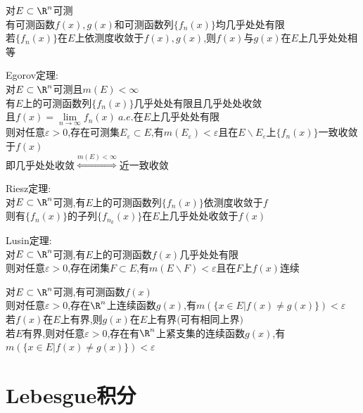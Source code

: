 \begin{dingli}
对$E\subset\R^n$可测\\
有可测函数$f(x),g(x)$和可测函数列$\{f_n(x)\}$均几乎处处有限\\
若$\{f_n(x)\}$在$E$上依测度收敛于$f(x),g(x)$,则$f(x)$与$g(x)$在$E$上几乎处处相等
\end{dingli}

\begin{dingli}
Egorov定理:\\
对$E\subset\R^n$可测且$m(E)<\infty$\\
有$E$上的可测函数列$\{f_n(x)\}$几乎处处有限且几乎处处收敛\\
且$f(x)=\lim\limits_{n\to\infty}f_n(x)\ a.e.$在$E$上几乎处处有限\\
则对任意$\varepsilon>0$,存在可测集$E_{\varepsilon}\subset E$,有$m(E_{\varepsilon})<\varepsilon$且在$E\backslash E_{\varepsilon}$上$\{f_n(x)\}$一致收敛于$f(x)$\\
即几乎处处收敛$\stackrel{m(E)<\infty}{\Leftrightarrow}$近一致收敛
\end{dingli}

\begin{dingli}
Riesz定理:\\
对$E\subset\R^n$可测,有$E$上的可测函数列$\{f_n(x)\}$依测度收敛于$f$\\
则有$\{f_n(x)\}$的子列$\{f_{n_k}(x)\}$在$E$上几乎处处收敛于$f(x)$
\end{dingli}

\begin{dingli}
Lusin定理:\\
对$E\subset\R^n$可测,有$E$上的可测函数$f(x)$几乎处处有限\\
则对任意$\varepsilon>0$,存在闭集$F\subset E$,有$m(E\backslash F)<\varepsilon$且在$F$上$f(x)$连续
\end{dingli}

\begin{dingli}
对$E\subset\R^n$可测,有可测函数$f(x)$\\
则对任意$\varepsilon>0$,存在$\R^n$上连续函数$g(x)$,有$m(\{x\in E|f(x)\neq g(x)\})<\varepsilon$\\
若$f(x)$在$E$上有界,则$g(x)$在$E$上有界$($可有相同上界$)$\\
若$E$有界,则对任意$\varepsilon>0$,存在有$\R^n$上紧支集的连续函数$g(x)$,有$m(\{x\in E|f(x)\neq g(x)\})<\varepsilon$
\end{dingli}

\chapter{Lebesgue积分}

